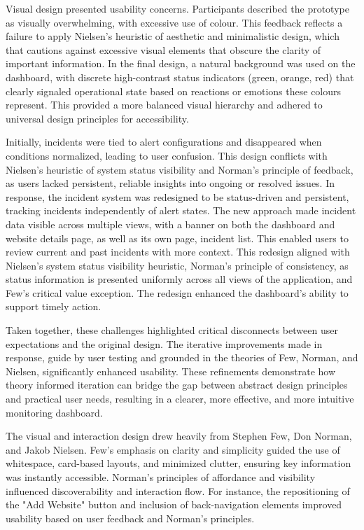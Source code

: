 Visual design presented usability concerns. Participants described the prototype as visually overwhelming, with excessive use of colour. This feedback reflects a failure to apply Nielsen's heuristic of aesthetic and minimalistic design, which that cautions against excessive visual elements that obscure the clarity of important information. In the final design, a natural background was used on the dashboard, with discrete high-contrast status indicators (green, orange, red) that clearly signaled operational state based on reactions or emotions these colours represent. This provided a more balanced visual hierarchy and adhered to universal design principles for accessibility. 

Initially, incidents were tied to alert configurations and disappeared when conditions normalized, leading to user confusion. This design conflicts with Nielsen's heuristic of system status visibility and Norman's principle of feedback, as users lacked persistent, reliable insights into ongoing or resolved issues. In response, the incident system was redesigned to be status-driven and persistent, tracking incidents independently of alert states. The new approach made incident data visible across multiple views, with a banner on both the dashboard and website details page, as well as its own page, incident list. This enabled users to review current and past incidents with more context. This redesign aligned with Nielsen's system status visibility heuristic, Norman's principle of consistency, as status information is presented uniformly across all views of the application, and Few's critical value exception. The redesign enhanced the dashboard's ability to support timely action. 

Taken together, these challenges highlighted critical disconnects between user expectations and the original design. The iterative improvements made in response, guide by user testing and grounded in the theories of Few, Norman, and Nielsen, significantly enhanced usability. These refinements demonstrate how theory informed iteration can bridge the gap between abstract design principles and practical user needs, resulting in a clearer, more effective, and more intuitive monitoring dashboard. 

The visual and interaction design drew heavily from Stephen Few, Don Norman, and Jakob Nielsen. Few's emphasis on clarity and simplicity guided the use of whitespace, card-based layouts, and minimized clutter, ensuring key information was instantly accessible. Norman's principles of affordance and visibility influenced discoverability and interaction flow. For instance, the repositioning of the "Add Website" button and inclusion of back-navigation elements improved usability based on user feedback and Norman's principles.

